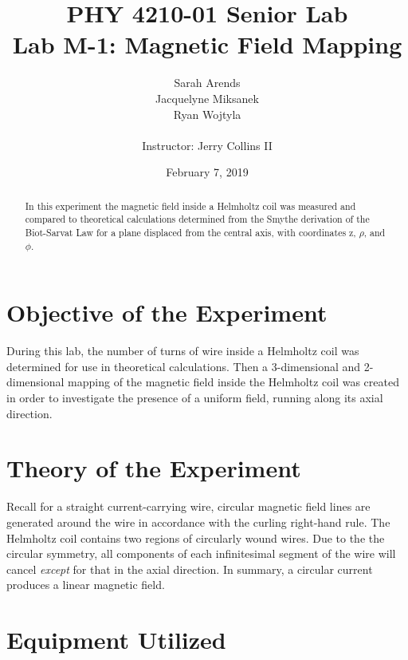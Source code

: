 \documentclass[a4paper]{article}
\title{PHY 4210-01 Senior Lab \\Lab M-1: Magnetic Field Mapping}
\author{Sarah Arends \\ 
        Jacquelyne Miksanek \\
        Ryan Wojtyla \\ \\
        Instructor: Jerry Collins II}
\date{February 7, 2019}
\begin{document}
\maketitle 

\begin{abstract}
In this experiment the magnetic field inside a Helmholtz coil was measured and compared to theoretical calculations determined from the Smythe derivation of the Biot-Sarvat Law for a plane displaced from the central axis, with coordinates z, $\rho$, and $\phi$. 
\end{abstract}

\newpage

\tableofcontents

\newpage

\section{Objective of the Experiment}
During this lab, the number of turns of wire inside a Helmholtz coil was determined for use in theoretical calculations. Then a 3-dimensional and 2-dimensional mapping of the magnetic field inside the Helmholtz coil was created in order to investigate the presence of a uniform field, running along its axial direction.

\section{Theory of the Experiment}

Recall for a straight current-carrying wire, circular magnetic field lines are generated around the wire in accordance with the curling right-hand rule. The Helmholtz coil contains two regions of circularly wound wires. Due to the the circular symmetry, all components of each infinitesimal segment of the wire will cancel \textit{except} for that in the axial direction. In summary, a circular current produces a linear magnetic field.

\section{Equipment Utilized}
\end{document}
